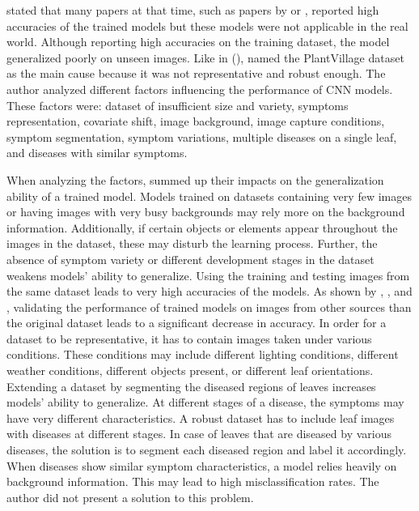 \documentclass{BachelorBUI}
\begin{document}
        \textcite{Barbedo:2018:2} stated that many papers at that time, such as papers by \textcite{Mohanty:2016} or \textcite{Ferentinos:2018}, reported high accuracies of the trained models but these models were not applicable in the real world. Although reporting high accuracies on the training dataset, the model generalized poorly on unseen images. Like in (\cite{Barbedo:2018:1}), \textcite{Barbedo:2018:2} named the PlantVillage dataset as the main cause because it was not representative and robust enough. The author analyzed different factors influencing the performance of CNN models. These factors were: dataset of insufficient size and variety, symptoms representation, covariate shift, image background, image capture conditions, symptom segmentation, symptom variations, multiple diseases on a single leaf, and diseases with similar symptoms.

        When analyzing the factors, \textcite{Barbedo:2018:2} summed up their impacts on the generalization ability of a trained model. Models trained on datasets containing very few images or having images with very busy backgrounds may rely more on the background information. Additionally, if certain objects or elements appear throughout the images in the dataset, these may disturb the learning process. Further, the absence of symptom variety or different development stages in the dataset weakens models' ability to generalize. Using the training and testing images from the same dataset leads to very high accuracies of the models. As shown by \textcite{Sladojevic:2016}, \textcite{Mohanty:2016}, and \textcite{Ferentinos:2018}, validating the performance of trained models on images from other sources than the original dataset leads to a significant decrease in accuracy. In order for a dataset to be representative, it has to contain images taken under various conditions. These conditions may include different lighting conditions, different weather conditions, different objects present, or different leaf orientations. Extending a dataset by segmenting the diseased regions of leaves increases models' ability to generalize. At different stages of a disease, the symptoms may have very different characteristics. A robust dataset has to include leaf images with diseases at different stages. In case of leaves that are diseased by various diseases, the solution is to segment each diseased region and label it accordingly. When diseases show similar symptom characteristics, a model relies heavily on background information. This may lead to high misclassification rates. The author did not present a solution to this problem.
\end{document}
